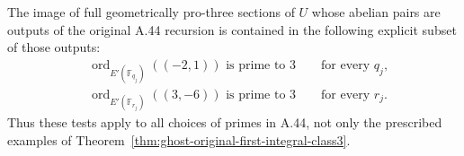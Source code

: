 \begin{proposition}
\label{prop:ghost-elliptic-support-test}
The image of full geometrically pro-three sections
of \(U\) whose abelian pairs are outputs of the
original A.44 recursion is contained in the following
explicit subset of those outputs:
\[
 \begin{split}
 &\operatorname{ord}_{E'(\mathbb F_{q_j})}((-2,1))
                              \text{ is prime to }3
                              \qquad\text{for every }q_j,\\
 &\operatorname{ord}_{E'(\mathbb F_{r_j})}((3,-6))
                              \text{ is prime to }3
                              \qquad\text{for every }r_j.
 \end{split}                                            \tag{16}
\]
Thus these tests apply to all choices of primes in
A.44, not only the prescribed examples of
Theorem~\ref{thm:ghost-original-first-integral-class3}.
\end{proposition}
